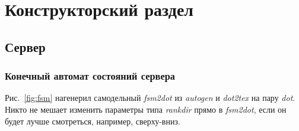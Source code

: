 \documentclass[a4paper,12pt]{report}
\begin{document}






\chapter{Конструкторский раздел}

\section{Сервер}

\subsection{Конечный автомат состояний сервера}

Рис.~\ref{fig:fsm} нагенерил самодельный \textit{fsm2dot} из \textit{autogen} и \textit{dot2tex} на пару \textit{dot}. Никто не мешает изменить параметры типа \textit{rankdir} прямо в \textit{fsm2dot}, если он будет лучше смотреться, например, сверху-вниз.
\end{document}
